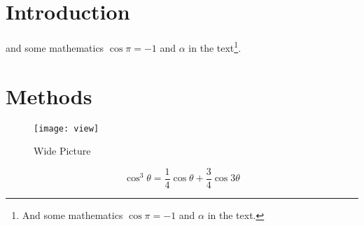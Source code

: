 



\maketitle %

\tableofcontents %

\thispagestyle{empty} %


\section*{Introduction} %


\lipsum[1-3] %
 and some mathematics $\cos\pi=-1$ and $\alpha$ in the text\footnote{And some mathematics $\cos\pi=-1$ and $\alpha$ in the text.}.


\section{Methods}

\begin{figure*}[ht]\centering %
\texttt{[image: view]}
	            \caption{Wide Picture}
\label{fig:view}
\end{figure*}

\lipsum[4] %

\begin{equation}
	\cos^3 \theta =\frac{1}{4}\cos\theta+\frac{3}{4}\cos 3\theta
	\label{eq:refname2}
\end{equation}

